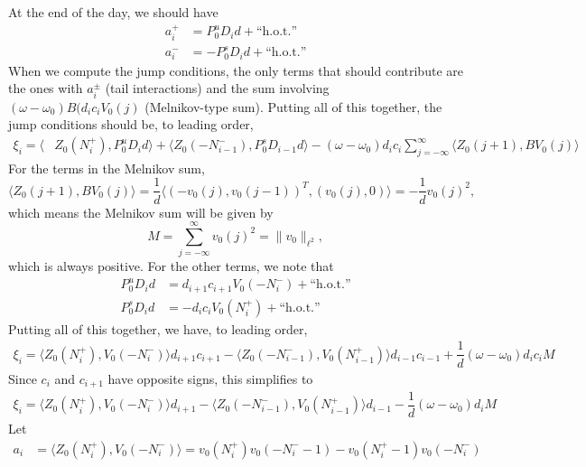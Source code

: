 \documentclass[12pt]{article}
\begin{document}
At the end of the day, we should have
\begin{align*}
a_i^+ &= P_0^u D_i d + \text{``h.o.t.''} \\
a_i^- &= -P_0^s D_i d + \text{``h.o.t.''}
\end{align*}
When we compute the jump conditions, the only terms that should contribute are the ones with $a_i^\pm$ (tail interactions) and the sum involving $(\omega - \omega_0) B (d_i c_i V_0(j)$ (Melnikov-type sum). Putting all of this together, the jump conditions should be, to leading order, 
\begin{equation}\label{eq:xieq}
\begin{aligned}
\xi_i = \langle &Z_0(N_i^+), P_0^u D_i d \rangle 
+ \langle Z_0(-N_{i-1}^-), P_0^s D_{i-1} d \rangle 
- (\omega - \omega_0) d_i c_i \sum_{j = -\infty}^{\infty} \langle Z_0(j+1), B V_0(j)\rangle
\end{aligned}
\end{equation}
For the terms in the Melnikov sum,
\[
\langle Z_0(j+1), B V_0(j)\rangle = \frac{1}{d} \langle (-v_0(j), v_0(j-1))^T, (v_0(j), 0) \rangle
= -\frac{1}{d}v_0(j)^2,
\]
which means the Melnikov sum will be given by
\begin{equation}\label{eq:M}
M = \sum_{j = -\infty}^{\infty} v_0(j)^2 = \| v_0 \|_{\ell^2},
\end{equation}
which is always positive. For the other terms, we note that
\begin{align*}
P_0^u D_i d &= d_{i+1} c_{i+1} V_0(-N_i^-) + \text{``h.o.t.''} \\
P_0^s D_i d &= -d_i c_i V_0(N_i^+) + \text{``h.o.t.''}
\end{align*}
Putting all of this together, we have, to leading order,
\begin{align*}
\xi_i = \langle Z_0(N_i^+), V_0(-N_i^-) \rangle d_{i+1} c_{i+1}
- \langle Z_0(-N_{i-1}^-), V_0(N_{i-1}^+) \rangle d_{i-1} c_{i-1}
+ \dfrac{1}{d} (\omega - \omega_0) d_i c_i M
\end{align*}
Since $c_i$ and $c_{i+1}$ have opposite signs, this simplifies to 
\begin{align*}
\xi_i = \langle Z_0(N_i^+), V_0(-N_i^-) \rangle d_{i+1}
- \langle Z_0(-N_{i-1}^-), V_0(N_{i-1}^+) \rangle d_{i-1}
- \dfrac{1}{d} (\omega - \omega_0) d_i M
\end{align*}
Let
\begin{align*}
a_i &= \langle Z_0(N_i^+), V_0(-N_i^-) \rangle 
= v_0(N_i^+)v_0(-N_i^- - 1) - v_0(N_i^+ - 1)v_0(-N_i^-)
\end{align*}
\end{document}
